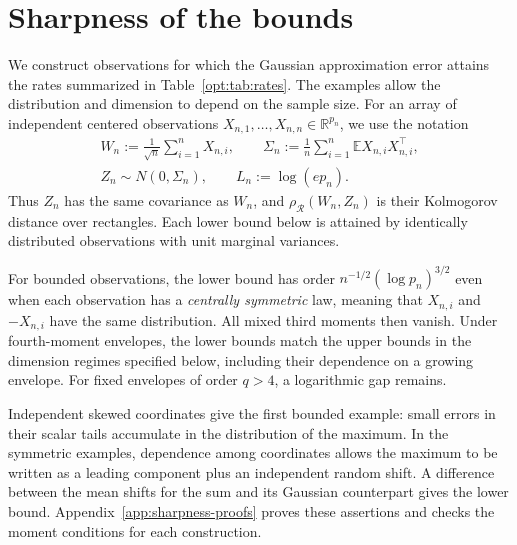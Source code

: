 \documentclass[11pt,letterpaper]{article}
\theoremstyle{remark}
\newcommand{\E}{\mathbb E}
\newcommand{\R}{\mathbb R}
\newcommand{\rh}{\rho_{\mathcal R}}
\begin{document}
\section{Sharpness of the bounds}\label{opt:section}

We construct observations for which the Gaussian approximation error
attains the rates summarized in Table~\ref{opt:tab:rates}. The examples
allow the distribution and dimension to depend on the sample size.
For an array of independent centered observations
\(X_{n,1},\ldots,X_{n,n}\in\R^{p_n}\), we use the notation
\begin{equation}
\begin{gathered}
 W_n:=\frac1{\sqrt n}\sum_{i=1}^nX_{n,i},\qquad
 \Sigma_n:=\frac1n\sum_{i=1}^n\E X_{n,i}X_{n,i}^{\top},\\
 Z_n\sim N(0,\Sigma_n),\qquad L_n:=\log(ep_n).
\end{gathered}
\label{lower:eq:setup}
\end{equation}
Thus \(Z_n\) has the same covariance as \(W_n\), and
\(\rh(W_n,Z_n)\) is their Kolmogorov distance over rectangles.
Each lower bound below is attained by identically distributed
observations with unit marginal variances.

For bounded observations, the lower bound has order
\(n^{-1/2}(\log p_n)^{3/2}\) even when each observation has a
\emph{centrally symmetric} law, meaning that
\(X_{n,i}\) and \(-X_{n,i}\) have the same distribution.
All mixed third moments then vanish. Under fourth-moment envelopes,
the lower bounds match the upper bounds in the dimension regimes
specified below, including their dependence on a growing envelope.
For fixed envelopes of order \(q>4\), a logarithmic gap remains.

Independent skewed coordinates give the first bounded example:
small errors in their scalar tails accumulate in the distribution of
the maximum. In the symmetric examples, dependence among coordinates
allows the maximum to be written as a leading component plus an
independent random shift. A difference between the mean shifts for
the sum and its Gaussian counterpart gives the lower bound.
Appendix~\ref{app:sharpness-proofs} proves these assertions and checks
the moment conditions for each construction.
\end{document}
